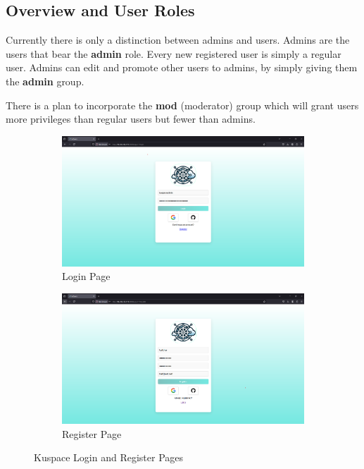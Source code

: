 \subsection{Overview and User Roles}

Currently there is only a distinction between admins and users. Admins are the users that bear the \textbf{admin} role.
Every new registered user is simply a regular user. Admins can edit and promote other users to admins, by simply 
giving them the \textbf{admin} group.

There is a plan to incorporate the \textbf{mod} (moderator) group which will grant users more privileges than 
regular users but fewer than admins.

\begin{figure}[!htbp]
  \centering
  \begin{subfigure}[b]{0.48\textwidth}
    \includegraphics[width=\textwidth]{Images/kuspace_login-page.png}
    \caption{Login Page}
    \label{fig:login}
  \end{subfigure}
  \hfill
  \begin{subfigure}[b]{0.48\textwidth}
    \includegraphics[width=\textwidth]{Images/kuspace_register-page.png}
    \caption{Register Page}
    \label{fig:register}
  \end{subfigure}
  \caption{Kuspace Login and Register Pages}
  \label{fig:authservices}
\end{figure}



